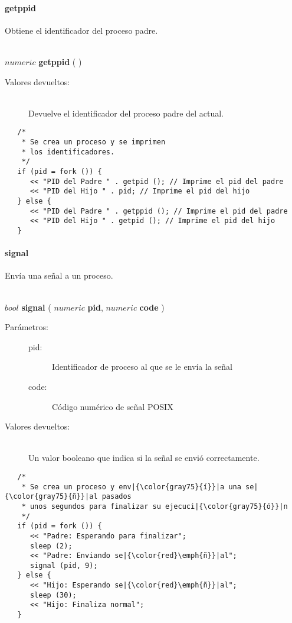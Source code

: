 \paragraph{getppid}
Obtiene el identificador del proceso padre.


\begin{framed}
\hfill \\ $numeric$ \textbf{getppid} ( )  
\begin{description}
\item[Valores devueltos:] \hfill \\
   Devuelve el identificador del proceso padre del actual.
\end{description}
\end{framed}
     
\begin{lstlisting}  
   /*
    * Se crea un proceso y se imprimen
    * los identificadores.
    */
   if (pid = fork ()) {
      << "PID del Padre " . getpid (); // Imprime el pid del padre
      << "PID del Hijo " . pid; // Imprime el pid del hijo
   } else {
      << "PID del Padre " . getppid (); // Imprime el pid del padre
      << "PID del Hijo " . getpid (); // Imprime el pid del hijo
   }
\end{lstlisting}

\paragraph{signal}
Envía una señal a un proceso. 

\begin{framed}
\hfill \\ $bool$ \textbf{signal} ( $numeric$ \textbf{pid}, $numeric$ \textbf{code} )  
\begin{description}
\item [Parámetros:] \hfill 
   \begin{description}
   \item[pid:] Identificador de proceso al que se le envía la señal
   \item[code:] Código numérico de señal POSIX
   \end{description}
\item[Valores devueltos:] \hfill \\
   Un valor booleano que indica si la señal se envió correctamente. 
\end{description}
\end{framed}
     
\begin{lstlisting}  
   /*
    * Se crea un proceso y env|{\color{gray75}{í}}|a una se|{\color{gray75}{ñ}}|al pasados
    * unos segundos para finalizar su ejecuci|{\color{gray75}{ó}}|n
    */
   if (pid = fork ()) {
      << "Padre: Esperando para finalizar";
      sleep (2);
      << "Padre: Enviando se|{\color{red}\emph{ñ}}|al";
      signal (pid, 9);
   } else {
      << "Hijo: Esperando se|{\color{red}\emph{ñ}}|al";
      sleep (30);
      << "Hijo: Finaliza normal";
   }
\end{lstlisting}

